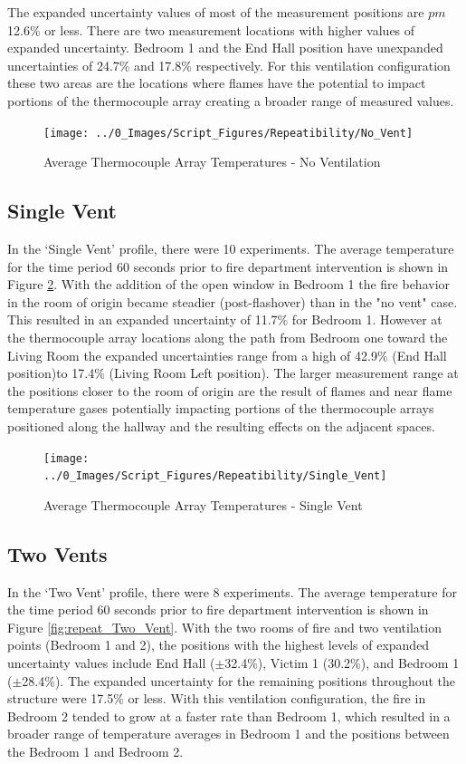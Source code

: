 \documentclass[12pt,oneside]{book}
\begin{document}
The expanded uncertainty values of most of the measurement positions are $pm$12.6\% or less.  There are two measurement locations with higher values of expanded uncertainty. Bedroom 1 and the End Hall position have unexpanded uncertainties of 24.7\% and 17.8\% respectively.  For this ventilation configuration these two areas are the locations where flames have the potential to impact portions of the thermocouple array creating a broader range of measured values.   

\begin{figure}[H]
\centering
\texttt{[image: ../0\_Images/Script\_Figures/Repeatibility/No\_Vent]}
\caption{Average Thermocouple Array Temperatures - No Ventilation}
\label{fig:repeat_No_Vent}
\end{figure}

\subsection{Single Vent}
In the `Single Vent' profile, there were 10 experiments. The average temperature for the time period 60 seconds prior to fire department intervention is shown in Figure \ref{fig:repeat_Single_Vent}.  With the addition of the open window in Bedroom 1 the fire behavior in the room of origin became steadier (post-flashover) than in the "no vent" case. This resulted in an expanded uncertainty of 11.7\% for Bedroom 1.  However at the thermocouple array locations along the path from Bedroom one toward the Living Room the expanded uncertainties range from a high of 42.9\% (End Hall position)to 17.4\% (Living Room Left position). The larger measurement range at the positions closer to the room of origin are the result of flames and near flame temperature gases potentially impacting portions of the thermocouple arrays positioned along the hallway and the resulting effects on the adjacent spaces.   


\begin{figure}[H]
\centering
\texttt{[image: ../0\_Images/Script\_Figures/Repeatibility/Single\_Vent]}
\caption{Average Thermocouple Array Temperatures - Single Vent}
\label{fig:repeat_Single_Vent}
\end{figure}

\subsection{Two Vents}
In the `Two Vent' profile, there were 8 experiments. The average temperature for the time period 60 seconds prior to fire department intervention is shown in Figure \ref{fig:repeat_Two_Vent}. With the two rooms of fire and two ventilation points (Bedroom 1 and 2), the positions with the highest levels of expanded uncertainty values include End Hall ($\pm$32.4\%), Victim 1 (30.2\%), and Bedroom 1 ($\pm$28.4\%). The expanded uncertainty for the remaining positions throughout the structure were 17.5\% or less.  With this ventilation configuration, the fire in Bedroom 2 tended to grow at a faster rate than Bedroom 1, which resulted in a broader range of temperature averages in Bedroom 1 and the positions between the Bedroom 1 and Bedroom 2.   
\end{document}
